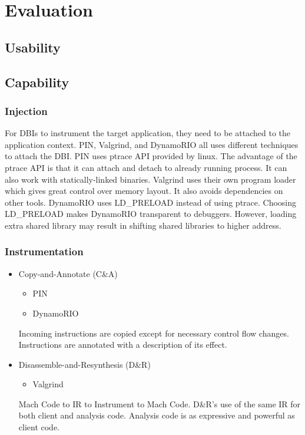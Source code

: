 
\section{Evaluation}
\label{sec:evaluation}
\subsection{Usability}
\subsection{Capability}
\subsubsection{Injection}
For DBIs to instrument the target application, they need to be attached to the application context. PIN, Valgrind, and DynamoRIO all uses different techniques to attach the DBI. PIN uses ptrace API provided by linux. The advantage of the ptrace API is that it can attach and detach to already running process. It can also work with statically-linked binaries. Valgrind uses their own program loader which gives great control over memory layout. It also avoids dependencies on other tools. DynamoRIO uses LD\_PRELOAD instead of using ptrace. Choosing LD\_PRELOAD makes DynamoRIO transparent to debuggers. However, loading extra shared library may result in shifting shared libraries to higher address.
\subsubsection{Instrumentation}
\begin{itemize}
	\item Copy-and-Annotate (C\&A)
	\begin{itemize}
		\item PIN 
		\item DynamoRIO
	\end{itemize}
	Incoming instructions are copied except for necessary control flow changes.
	Instructions are annotated with a description of its effect.
	\item Disassemble-and-Resynthesis (D\&R)
	\begin{itemize}
		\item Valgrind
	\end{itemize}
	Mach Code to IR to Instrument to Mach Code.
	D\&R's  use of the same IR for both client and analysis code.
	Analysis code is as expressive and powerful as client code. 
\end{itemize}
